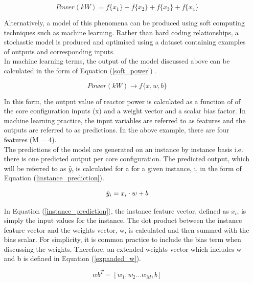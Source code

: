 \begin{equation} \label{linear_model}
	Power (kW) = f\{x_1\} + f\{x_2\} + f\{x_3\} + f\{x_4\} 
\end{equation}


\noindent
Alternatively, a model of this phenomena can be produced using soft computing techniques \cite{ibrahim2016overview} such as machine learning. Rather than hard coding relationships, a stochastic model is produced and optimised using a dataset containing examples of outputs and corresponding inputs. \\

\noindent
In machine learning terms, the output of the model discussed above can be calculated in the form of Equation (\ref{soft_power}) .

\begin{equation} \label{soft_power}
	Power(kW)  \rightarrow f\{x, w, b\}
\end{equation}

\noindent
In this form, the output value of reactor power is calculated as a function of of the core configuration inputs (x) and a weight vector and a scalar bias factor. In machine learning practice, the input variables are referred to as features and the outputs are referred to as predictions. In the above example, there are four features (M = 4). \\

\noindent
The predictions of the model are generated on an instance by instance basis i.e. there is one predicted output per core configuration. The predicted output, which will be referred to as $\hat{y}$, is calculated for a for a given instance, i, in the form of Equation (\ref{instance_prediction}).

\begin{equation} \label{instance_prediction}
	\hat{y}_i = x_i \space \cdot \space w + b
\end{equation}

\noindent 
In Equation (\ref{instance_prediction}), the instance feature vector, defined as $x_i$, is simply the input values for the instance. The dot product between the instance feature vector and the weights vector, w, is calculated and then summed with the bias scalar. For simplicity, it is common practice to include the bias term when discussing the weights. Therefore, an extended weights vector which includes w and b is defined in Equation (\ref{expanded_w}).

\begin{equation} \label{expanded_w}
	wb^T = [w_1, w_2 ... w_M, b]
\end{equation}

